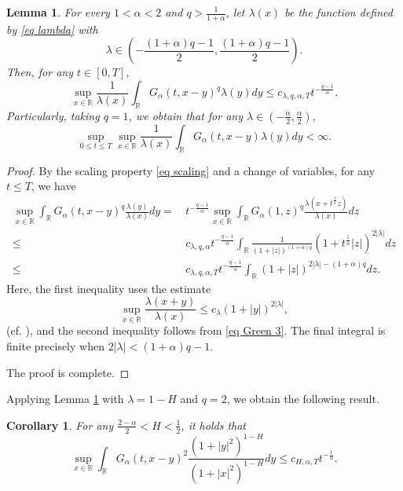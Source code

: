 \documentclass[11pt,reqno]{amsart}
\numberwithin{equation}{section}
\newtheorem{lemma}{Lemma}[section]
\newtheorem{corollary}[theorem]{Corollary}
\newcommand{\1}{{\bf 1}}
\newcommand{\2}{{\bf 2}}
\begin{document}
 
\begin{lemma}\label{lem 2.5}
 For every $1<\alpha<2$ and  $q>\frac{1}{1+\alpha}$,  let $\lambda(x)$ be the function defined by  \eqref{eq lambda} with  $$\lambda\in \left(-\frac{(1+\alpha)q-1}{2},\frac{(1+\alpha)q-1}{2}\right).$$ 
  Then,  for any $t\in [0,T]$,
\begin{equation}\label{eq power esti2}
\sup_{x\in\mathbb{R}} \frac{1}{\lambda(x)}\int_{\mathbb{R}}G_{\alpha}(t,x-y)^q \lambda(y) dy\le c_{\lambda,q,\alpha,T} t^{-\frac{q-1}{\alpha}}.
\end{equation}
Particularly, taking $q=1$,  we obtain that for any  $\lambda\in(-\frac{\alpha}{2},\frac{\alpha}{2})$, 
\begin{equation}\label{eq power esti1}
\sup_{0\le t\le T}\sup_{x\in\mathbb{R}}\frac{1}{\lambda(x)}\int_{\mathbb{R}}G_{\alpha}(t,x-y)\lambda(y)dy<\infty.
\end{equation}
  \end{lemma}
\begin{proof}
  By the scaling property \eqref{eq scaling} and a change of variables,   for any   $t\le T$, we have   
  \begin{align*}%
 \sup_{x\in \mathbb R}\int_{\mathbb{R}}G_{\alpha}(t,x-y)^q\frac{\lambda(y)}{\lambda(x)}dy 
 = &\,   t^{-\frac{q-1}{\alpha}}   \sup_{x\in \mathbb R}   \int_{\mathbb{R}} G_{\alpha}(1,z )^q\frac{\lambda\left(x+t^{\frac1{\alpha}}z\right)}{\lambda\left(x\right)}dz\\
 \le &\,   c_{\lambda,q,\alpha}t^{-\frac{q-1}{\alpha}}\int_{\mathbb{R}} \frac{1}{(1+|z|)^{(1+\alpha)q}}\left(1+t^{\frac1{\alpha}}|z|\right)^{2|\lambda|}dz\\
 \le  &\,   c_{\lambda,q,\alpha,T}t^{-\frac{q-1}{\alpha}}\int_{\mathbb{R}}(1+|z|)^{2|\lambda|-(1+\alpha)q}dz.
\end{align*} 
 Here, the first inequality uses the estimate 
  $$
\sup_{x\in\mathbb{R}}\frac{\lambda(x+y)}{\lambda(x)}\le c_{\lambda}(1+|y|)^{2|\lambda|},
$$
 (cf. \cite[Lemma 2.5]{HW2022}),  and the second inequality follows from  \eqref{eq Green 3}.   
The final integral is finite precisely when   $2|\lambda|<(1+\alpha)q-1$. 

The proof is complete. 
\end{proof}

Applying Lemma \ref{lem 2.5} with $\lambda=1-H$ and  $q=2$,   we obtain  the following result. 
\begin{corollary}
For  any $ \frac{2-\alpha}{2}<H<\frac 12$,     it holds that
 \begin{equation}\label{eq power esti3}
\sup_{x\in\mathbb{R}}\int_{\mathbb{R}}G_{\alpha}(t,x-y)^2\frac{(1+|y|^2)^{1-H}}{(1+|x|^2)^{1-H}}dy\le c_{H,\alpha,T} t^{-\frac{1}{\alpha}}.
\end{equation}
\end{corollary}
\end{document}
